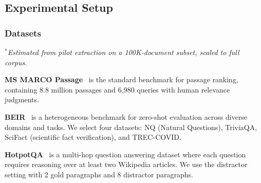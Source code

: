 \documentclass[sigconf,review]{acmart}
\begin{document}
\subsection{Experimental Setup}
\label{sec:setup}

\subsubsection{Datasets}

\begin{table}[t]
\caption{Dataset statistics. \#Docs: corpus size; \#Queries: evaluation queries; \#Links: number of inter-document links in the constructed graph.}
\label{tab:datasets}
\centering
{}
\end{table}

\noindent\textit{$^*$Estimated from pilot extraction on a 100K-document subset, scaled to full corpus.}

\textbf{MS MARCO Passage}~\citep{nguyen2016msmarco} is the standard benchmark for passage ranking,
containing 8.8 million passages and 6,980 queries with human relevance judgments.

\textbf{BEIR}~\citep{thakur2021beir} is a heterogeneous benchmark for zero-shot evaluation across
diverse domains and tasks. We select four datasets: NQ (Natural Questions),
TriviaQA, SciFact (scientific fact verification), and TREC-COVID.

\textbf{HotpotQA}~\citep{yang2018hotpotqa} is a multi-hop question answering dataset where each
question requires reasoning over at least two Wikipedia articles. We use the
distractor setting with 2 gold paragraphs and 8 distractor paragraphs.
\end{document}
